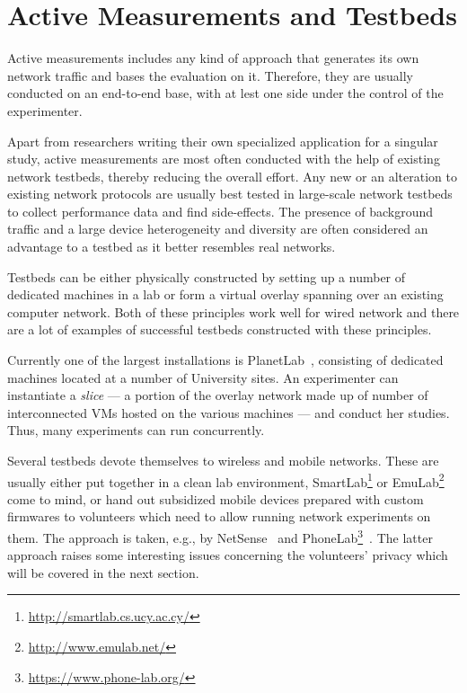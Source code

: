 \section{Active Measurements and Testbeds}

Active measurements includes any kind of approach that generates its own network traffic and bases the evaluation on it. Therefore, they are usually conducted on an end-to-end base, with at lest one side under the control of the experimenter.

Apart from researchers writing their own specialized application for a singular study, active measurements are most often conducted with the help of existing network testbeds, thereby reducing the overall effort.
Any new or an alteration to existing network protocols are usually best tested in large-scale network testbeds to collect performance data and find side-effects. The presence of background traffic and a large device heterogeneity and diversity are often considered an advantage to a testbed as it better resembles real networks.

Testbeds can be either physically constructed by setting up a number of dedicated machines in a lab or form a virtual overlay spanning over an existing computer network. Both of these principles work well for wired network and there are a lot of examples of successful testbeds constructed with these principles.

Currently one of the largest installations is PlanetLab~\cite{chun2003planetlab}, consisting of dedicated machines located at a number of University sites. An experimenter can instantiate a \textit{slice} --- a portion of the overlay network made up of number of interconnected \glspl{VM} hosted on the various machines --- and conduct her studies. Thus, many experiments can run concurrently.

Several testbeds devote themselves to wireless and mobile networks. These are usually either put together in a clean lab environment, SmartLab\footnote{\url{http://smartlab.cs.ucy.ac.cy/}} or 
EmuLab\footnote{\url{http://www.emulab.net/}} come to mind, or hand out subsidized mobile devices prepared with custom firmwares to volunteers which need to allow running network experiments on them. The approach is taken, e.g., by NetSense~\cite{Striegel:2013:LLN:2491159.2491171} and PhoneLab\footnote{\url{https://www.phone-lab.org/}}~\cite{Nandugudi:2013:PLP:2536714.2536718}. The latter approach raises some interesting issues concerning the volunteers' privacy which will be covered in the next section.

